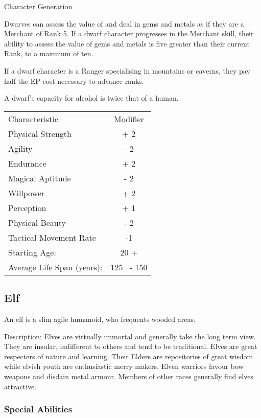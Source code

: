 \begin{Chapter}{Character Generation}
\begin{Enumerate}
\item Dwarves can assess the value of and deal in gems and metals as
  if they are a Merchant of Rank 5.  If a dwarf character progresses
  in the Merchant skill, their ability to assess the value of gems and
  metals is five greater than their current Rank, to a maximum of ten.

\item If a dwarf character is a Ranger specialising in mountains or
  caverns, they pay half the EP cost necessary to advance ranks.

\item A dwarf’s capacity for alcohol is twice that of a human.

\end{Enumerate}

\begin{tabularx}{\columnwidth}{Xc} 
Characteristic			& Modifier \\
Physical Strength		& + 2 \\
Agility				& - 2 \\
Endurance			& + 2 \\
Magical Aptitude		& - 2 \\
Willpower			& + 2 \\
Perception			& + 1 \\
Physical Beauty			& - 2 \\
Tactical Movement Rate		& -1 \\
Starting Age:			& 20 + \\
Average Life Span (years):	& 125 –- 150 \\
\end{tabularx}

\subsection{Elf}

An elf is a slim agile humanoid, who frequents wooded areas.

Description: Elves are virtually immortal and generally take the long
term view.  They are insular, indifferent to others and tend to be
traditional.  Elves are great respecters of nature and learning.
Their Elders are repositories of great wisdom while elvish youth are
enthusiastic merry makers.  Elven warriors favour bow weapons and
disdain metal armour.  Members of other races generally find elves
attractive.

\subsubsection{Special Abilities}


\end{Chapter}
